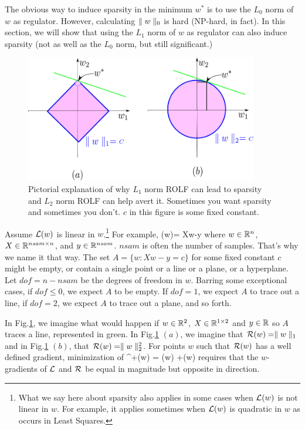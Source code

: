 The obvious way to induce sparsity in 
the minimum $w^*$ is to use the $L_0$ norm of $w$ as regulator.
However, calculating $\parallel w\parallel_0$ is
hard (NP-hard, in fact). In this section, we will
show that using the $L_1$ norm
of $w$ as regulator can also induce sparsity (not as well as the
$L_0$ norm, but still significant.)
\begin{figure}[h!]
\centering
\includegraphics[width=4in]
{regularization/sparsity.png}
\caption{Pictorial explanation of
why $L_1$ norm ROLF can lead to sparsity
and $L_2$ norm ROLF can help avert it. Sometimes 
you want sparsity and sometimes you don't. $c$ in this figure is some 
fixed constant.
}
\label{fig-sparsity}
\end{figure}

Assume ${\cal L}(w)$ is linear in $w$.\footnote{What we say here about sparsity also applies in some cases when ${\cal L}(w)$ is not linear in $w$. For example, it applies sometimes when ${\cal L}(w)$
is quadratic in $w$ as occurs in Least Squares.}
For example, 
\beq
\call(w)= Xw-y
\eeq
where $w\in{ \mathbb{R}}^n$, $X\in { \mathbb{R}}^{nsam\times n}$,  and $y\in{ \mathbb{R}}^{nsam}$.
$nsam$ is often the number of samples. That's why we name it that way.
The set $A=\{w: Xw-y=c\}$ for some fixed constant $c$  might be empty,
or contain a single point or a line or a plane, or a hyperplane. Let $dof=n-nsam$
be the degrees  of freedom in $w$.
Barring some exceptional cases, if $dof\leq 0$, we expect $A$ to be empty.
If $dof=1$, we expect $A$ to trace out a line, if $dof= 2$, we expect $A$ to
trace out a plane, and so forth.

In Fig.\ref{fig-sparsity}, we imagine
what would happen if
$w\in { \mathbb{R}}^2$, $X\in { \mathbb{R}}^{1\times 2}$
and $y\in { \mathbb{R}}$ so $A$ traces a line,
represented in green.
In Fig.\ref{fig-sparsity} $(a)$,
we imagine that ${\cal R}(w)=\parallel w\parallel_1$
and in Fig.\ref{fig-sparsity} $(b)$, that
${\cal R}(w)=\parallel w\parallel_2^2$.
For points $w$ such that ${\cal R}(w)$
has a well defined gradient, 
minimization of 
\beq
\call^+(w) = \call(w) +\calr(w)
\eeq
requires that the $w$-gradients of
${\cal L}$ and ${\cal R}$ be equal in magnitude but opposite in direction.

